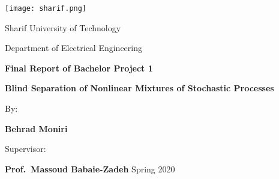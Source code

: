 \begin{latin}
\begin{titlepage}
\vspace*{1cm}
\begin{center}

\texttt{[image: sharif.png]}

 \large
Sharif University of Technology


Department of Electrical Engineering

\vspace*{1cm}
\large
\textbf{Final Report of Bachelor Project 1}

\vspace*{1.5cm}
\huge
\textbf{Blind Separation of Nonlinear Mixtures of Stochastic Processes} 
\vspace{1.5cm}

\Large

By:

\textbf{Behrad Moniri}
\vspace{1cm}

Supervisor:

\textbf{Prof.~Massoud Babaie-Zadeh}
\vfill
\large
\vspace{1.5cm}
Spring 2020
       

\end{center}
\end{titlepage}
\end{latin}
